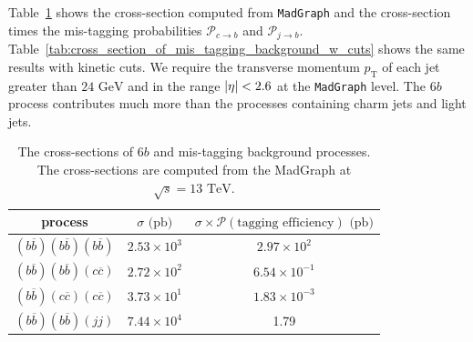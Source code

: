 \documentclass[12pt]{article}
\begin{document}
    Table~\ref{tab:cross_section_of_mis_tagging_background} shows the cross-section computed from \verb|MadGraph| and the cross-section times the mis-tagging probabilities $\mathcal{P}_{c\to b}$ and $\mathcal{P}_{j\to b}$. Table~\ref{tab:cross_section_of_mis_tagging_background_w_cuts} shows the same results with kinetic cuts. We require the transverse momentum $p_{\text{T}}$ of each jet greater than $\text{24 GeV}$ and in the range $\abs{\eta} < 2.6$ at the \verb|MadGraph| level. The $6b$ process contributes much more than the processes containing charm jets and light jets.
    \begin{table}[htpb]
        \centering
        \caption{The cross-sections of $6b$ and mis-tagging background processes. The cross-sections are computed from the MadGraph at $\sqrt{s} = 13 \text{ TeV}$.}
        \label{tab:cross_section_of_mis_tagging_background}
        \begin{tabular}{c|cc}
        process                                         & $\sigma\text{ (pb)}$ & $\sigma\times\mathcal{P}(\text{tagging efficiency})\text{ (pb)}$ \\ \hline
        $(b\overline{b})(b\overline{b})(b\overline{b})$ & $2.53 \times 10^{3}$ & $2.97 \times 10^{2}$                                             \\
        $(b\overline{b})(b\overline{b})(c\overline{c})$ & $2.72 \times 10^{2}$ & $6.54 \times 10^{-1}$                                            \\
        $(b\overline{b})(c\overline{c})(c\overline{c})$ & $3.73 \times 10^{1}$ & $1.83 \times 10^{-3}$                                            \\
        $(b\overline{b})(b\overline{b})(jj)$            & $7.44 \times 10^{4}$ & 1.79
        \end{tabular}
    \end{table}
\end{document}

